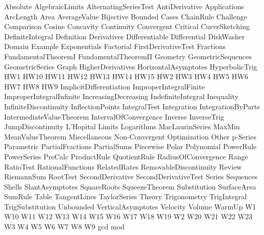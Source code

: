 Absolute
AlgebraicLimits 
AlternatingSeriesTest
AntiDerivative 
Applications 
ArcLength 
Area 
AverageValue 
Bijective
Bounded 
Cases 
ChainRule 
Challenge 
Comparison       
Cosine 
Concavity 
Continuity 
Convergent
Critical
CurveSketching 
DefiniteIntegral
Definition 
Derivatives
Differentiable 
Differential
DiskWasher
Domain
Example
Exponentials 
Factorial
FirstDerivativeTest 
Fractions        
FundamentalTheoremI 
FundamentalTheoremII 
Geometry 
GeometricSequences
GeometricSeries
Graph
HigherDerivatives
HorizontalAsymptotes 
HyperbolicTrig
HW1
HW10
HW11
HW12
HW13
HW14
HW15 
HW2
HW3
HW4
HW5
HW6
HW7
HW8
HW9
ImplicitDifferentiation 
ImproperIntegralFinite 
ImproperIntegralInfinite
IncreasingDecreasing
IndefiniteIntegral 
Inequality 
InfiniteDiscontinuity 
InflectionPoints       
IntegralTest 
Integration 
IntegrationByParts 
IntermediateValueTheorem 
IntervalOfConvergence 
Inverse
InverseTrig 
JumpDiscontinuity       
L'Hopital 
Limits 
Logarithms
MacLaurinSeries
MaxMin 
MeanValueTheorem 
Miscellaneous 
Non-Convergent 
Optimization 
Other 
p-Series    
Parametric 
PartialFractions
PartialSums
Piecewise
Polar 
Polynomial
PowerRule 
PowerSeries
PreCalc 
ProductRule 
QuotientRule 
RadiusOfConvergence 
Range  
RatioTest 
RationalFunctions
RelatedRates 
RemovableDiscontinuity
Review 
RiemannSum 
RootTest 
SecondDerivative
SecondDerivativeTest 
Series 
Sequences
Shells
SlantAsymptotes 
SquareRoots         
SqueezeTheorem 
Substitution 
SurfaceArea 
SumRule 
Table
TangentLines
TaylorSeries
Theory 
Trigonometry 
TrigIntegral 
TrigSubstitution 
Unbounded 
VerticalAsymptotes
Velocity
Volume
WarmUp
W1
W10
W11
W12
W13
W14
W15
W16
W17
W18
W19
W2
W20
W21
W22
W23
W3
W4
W5
W6
W7
W8
W9
gcd
mod

